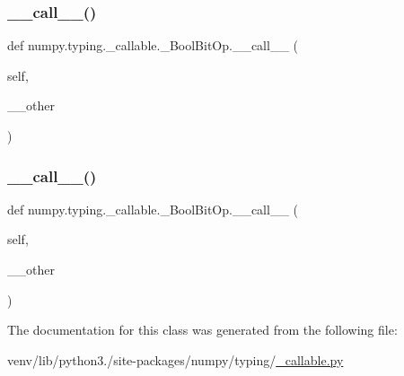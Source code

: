 \subsubsection{\texorpdfstring{\+\_\+\+\_\+call\+\_\+\+\_\+()}{\_\_call\_\_()}\hspace{0.1cm}{\footnotesize\ttfamily [2/3]}}
{\footnotesize\ttfamily def numpy.\+typing.\+\_\+callable.\+\_\+\+Bool\+Bit\+Op.\+\_\+\+\_\+call\+\_\+\+\_\+ (\begin{DoxyParamCaption}\item[{}]{self,  }\item[{}]{\+\_\+\+\_\+other }\end{DoxyParamCaption})}

\mbox{\label{classnumpy_1_1typing_1_1__callable_1_1__BoolBitOp_a04c0512a96244930db3e7aa8aff32919}} 
\subsubsection{\texorpdfstring{\+\_\+\+\_\+call\+\_\+\+\_\+()}{\_\_call\_\_()}\hspace{0.1cm}{\footnotesize\ttfamily [3/3]}}
{\footnotesize\ttfamily def numpy.\+typing.\+\_\+callable.\+\_\+\+Bool\+Bit\+Op.\+\_\+\+\_\+call\+\_\+\+\_\+ (\begin{DoxyParamCaption}\item[{}]{self,  }\item[{}]{\+\_\+\+\_\+other }\end{DoxyParamCaption})}



The documentation for this class was generated from the following file\+:\begin{DoxyCompactItemize}
\item 
venv/lib/python3./site-\/packages/numpy/typing/\hyperlink{__callable_8py}{\+\_\+callable.\+py}\end{DoxyCompactItemize}
